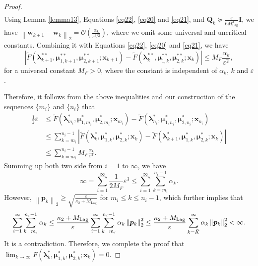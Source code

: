 \documentclass[aos]{imsart}
\numberwithin{equation}{section}
\theoremstyle{plain}
\begin{document}
\begin{appendix}
\begin{proof}
\begin{equation*}
\begin{split}
        \end{split}
    \end{equation*}
    Using Lemma \ref{lemma13}, Equations \eqref{eq22}, \eqref{eq20} and \eqref{eq21}, and $\bm{Q}_{k} \succeq \frac{\varepsilon}{ 6 M_{\text{Lag}}^2} \bm{I}$, we have $\left\| \bm{w}_{k+1} - \bm{w}_{k} \right\|_2 = \mathcal{O}\left( \frac{\alpha_k}{\varepsilon^{3/2}} \right)$, where we omit some universal and uncritical constants. Combining it with Equations \eqref{eq22}, \eqref{eq20} and \eqref{eq21}, we have 
    \begin{equation*}
        \left|  \widetilde{F}(\bm{\lambda}_{k+1}^{**}, \bm{\mu}_{1,k+1}^{**}, \bm{\mu}_{2,k+1}^{**}; \bm{x}_{k+1}) -  \widetilde{F}(\bm{\lambda}_{k}^{**}, \bm{\mu}_{1,k}^{**}, \bm{\mu}_{2,k}^{**}; \bm{x}_{k}) \right| \leq M_{F} \frac{\alpha_k}{\varepsilon^2},
    \end{equation*}
    for a universal constant $M_{F}>0$, where the constant is independent of $\alpha_k$, $k$ and $\varepsilon$.
    
    
    Therefore, it follows from the above inequalities and our construction of the sequences $\{m_i\}$ and $\{n_i\}$ that
    \begin{equation}
        \begin{split}
            \frac{1}{2} \varepsilon & \leq \widetilde{F}(\bm{\lambda}_{m_i}^{*}, \bm{\mu}_{1,m_i}^{*}, \bm{\mu}_{2,m_i}^{*}; \bm{x}_{m_i}) - \widetilde{F}(\bm{\lambda}_{n_i}^{*}, \bm{\mu}_{1,n_i}^{*}, \bm{\mu}_{2,n_i}^{*}; \bm{x}_{n_i}) \\
            & \leq \sum_{k=m_i}^{n_i -1} \left |\widetilde{F}(\bm{\lambda}_{k}^{*}, \bm{\mu}_{1,k}^{*}, \bm{\mu}_{2,k}^{*}; \bm{x}_{k}) - \widetilde{F}(\bm{\lambda}_{k+1}^{*}, \bm{\mu}_{1,k}^{*}, \bm{\mu}_{2,k}^{*}; \bm{x}_{k}) \right| \\
            & \leq \sum_{k=m_i}^{n_i -1} M_{F}  \frac{\alpha_k}{ \varepsilon^2}.
        \end{split}
    \end{equation}
    Summing up both two side from $i=1$ to $\infty$, we have 
    \begin{equation*}
         \infty = \sum_{i=1}^{\infty} \frac{1}{2 M_{F}} \varepsilon^3 \leq  \sum_{i=1}^{\infty} \sum_{k=m_i}^{n_i -1} \alpha_k.
    \end{equation*}
    However, $\left\| \bm{p}_{k} \right\|_2 \geq \sqrt{\frac{\varepsilon}{\kappa_2 + M_{\text{Lag}} }}$ for $m_i \leq k \leq n_i-1$, which further implies that 
    \begin{equation*}
         \sum_{i=1}^{\infty} \sum_{k=m_i}^{n_i -1}  \alpha_k  \leq \frac{ \kappa_2 + M_{\text{Lag}} }{\varepsilon } \sum_{i=1}^{\infty} \sum_{k=m_i}^{n_i -1} \alpha_k  \left\| \bm{p}_{k} \right\|_2^2 \leq \frac{ \kappa_2 + M_{\text{Lag}} }{\varepsilon } \sum_{k=\Bar{K}}^{\infty} \alpha_k  \left\| \bm{p}_{k} \right\|_2^2 < \infty.
    \end{equation*}
    It is a contradiction. Therefore, we complete the proof that $\lim_{k \to \infty} F(\bm{\lambda}_{k}^{*}, \bm{\mu}_{1,k}^{*}, \bm{\mu}_{2,k}^{*}; \bm{x}_k) = 0$.
\end{proof}




\end{appendix}
\end{document}
